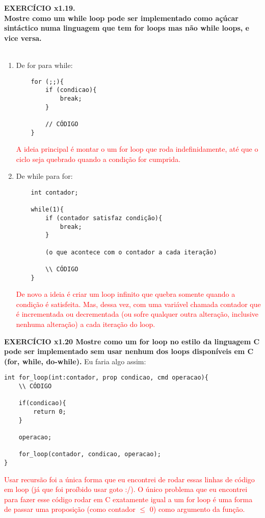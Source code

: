 \documentclass[a4paper, 12pt]{article}
\begin{document}
\noindent \textbf{EXERCÍCIO x1.19. \\
Mostre como um while loop pode ser implementado como açúcar sintáctico numa linguagem que tem for loops mas não while loops, e vice versa.} \\ \\
\begin{enumerate}
    \item De for para while:

    \begin{verbatim}
    for (;;){
        if (condicao){
            break;
        }

        // CÓDIGO
    }
    \end{verbatim}
    \textcolor{red}{A ideia principal é montar o um for loop que roda indefinidamente, até que o ciclo seja quebrado quando a condição for cumprida.}

    \item De while para for:
    
    \begin{verbatim}
    int contador;

    while(1){
        if (contador satisfaz condição){
            break;
        }

        (o que acontece com o contador a cada iteração)

        \\ CÓDIGO
    }
    \end{verbatim}

    \textcolor{red}{De novo a ideia é criar um loop infinito que quebra somente quando a condição é satisfeita. Mas, dessa vez, com uma variável chamada contador que é incrementada ou decrementada (ou sofre qualquer outra alteração, inclusive nenhuma alteração) a cada iteração do loop.}
        
\end{enumerate}
\vspace{1cm}
\noindent \textbf{EXERCÍCIO x1.20
Mostre como um for loop no estilo da linguagem C pode ser implementado sem usar
nenhum dos loops disponíveis em C (for, while, do-while).}
Eu faria algo assim:
\begin{verbatim}
int for_loop(int:contador, prop condicao, cmd operacao){
    \\ CÓDIGO

    if(condicao){
        return 0;
    }

    operacao;

    for_loop(contador, condicao, operacao);
}
\end{verbatim}
\textcolor{red}{Usar recursão foi a única forma que eu encontrei de rodar essas linhas de código em loop (já que foi proíbido usar goto :/). O único problema que eu encontrei para fazer esse código rodar em C exatamente igual a um for loop é uma forma de passar uma proposição (como contador $\leq$ 0) como argumento da função.}
\end{document}
